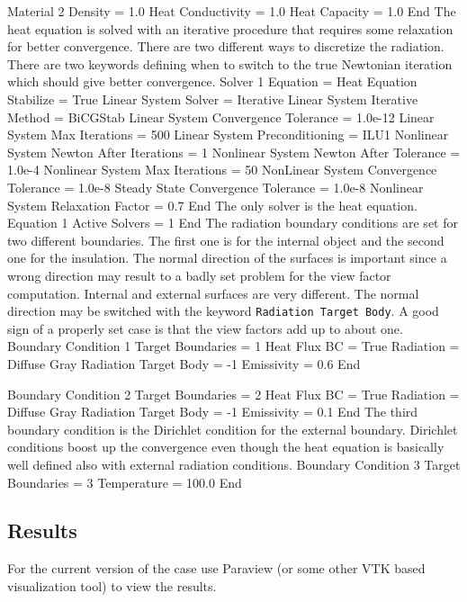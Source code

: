 Material 2
   Density = 1.0
   Heat Conductivity = 1.0
   Heat Capacity = 1.0
End
\ttend
The heat equation is solved with an iterative procedure that requires some relaxation 
for better convergence. There are two different ways to discretize the radiation. 
There are two keywords defining when to switch to the true Newtonian iteration
which should give better convergence.
\ttbegin
Solver 1
  Equation = Heat Equation
  Stabilize = True
  Linear System Solver = Iterative
  Linear System Iterative Method = BiCGStab
  Linear System Convergence Tolerance = 1.0e-12
  Linear System Max Iterations = 500
  Linear System Preconditioning = ILU1
  Nonlinear System Newton After Iterations = 1
  Nonlinear System Newton After Tolerance = 1.0e-4
  Nonlinear System Max Iterations = 50
  NonLinear System Convergence Tolerance = 1.0e-8
  Steady State Convergence Tolerance = 1.0e-8
  Nonlinear System Relaxation Factor = 0.7
End
\ttend
The only solver is the heat equation.
\ttbegin
Equation 1
  Active Solvers = 1
End
\ttend
%
The radiation boundary conditions are set for two different boundaries. The first one
is for the internal object and the second one for the insulation. The normal direction
of the surfaces is important since a wrong direction may result to a badly set problem for
the view factor computation. Internal and external surfaces are very different.
The normal direction may be switched with the keyword \texttt{Radiation Target Body}.
A good sign of a properly set case is that the view factors add up to about one.
\ttbegin
Boundary Condition 1
   Target Boundaries = 1
   Heat Flux BC = True
   Radiation = Diffuse Gray
   Radiation Target Body = -1
   Emissivity = 0.6
End

Boundary Condition 2
   Target Boundaries = 2
   Heat Flux BC = True
   Radiation = Diffuse Gray
   Radiation Target Body = -1
   Emissivity = 0.1
End
\ttend
%
The third boundary condition is the Dirichlet condition for the external boundary.
Dirichlet conditions boost up the convergence even though the heat equation is basically
well defined also with external radiation conditions.
\ttbegin
Boundary Condition 3
   Target Boundaries = 3
   Temperature = 100.0
End
\ttend


\subsection*{Results}

For the current version of the case use Paraview (or some other
VTK based visualization tool) to view the results. 

